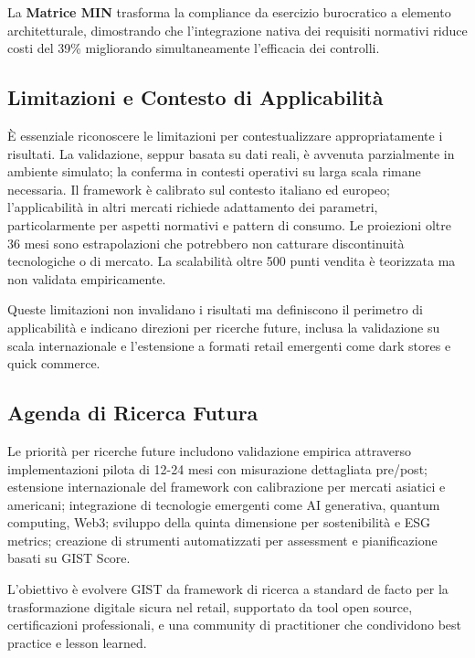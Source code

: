 La \textbf{Matrice MIN} trasforma la compliance da esercizio burocratico a elemento architetturale, dimostrando che l'integrazione nativa dei requisiti normativi riduce costi del 39\% migliorando simultaneamente l'efficacia dei controlli.

\subsection{\texorpdfstring{Limitazioni e Contesto di Applicabilità}{5.5.2 - Limitazioni e Contesto di Applicabilità}}
\label{subsec:5.5.2}

È essenziale riconoscere le limitazioni per contestualizzare appropriatamente i risultati. La validazione, seppur basata su dati reali, è avvenuta parzialmente in ambiente simulato; la conferma in contesti operativi su larga scala rimane necessaria. Il framework è calibrato sul contesto italiano ed europeo; l'applicabilità in altri mercati richiede adattamento dei parametri, particolarmente per aspetti normativi e pattern di consumo. Le proiezioni oltre 36 mesi sono estrapolazioni che potrebbero non catturare discontinuità tecnologiche o di mercato. La scalabilità oltre 500 punti vendita è teorizzata ma non validata empiricamente.

Queste limitazioni non invalidano i risultati ma definiscono il perimetro di applicabilità e indicano direzioni per ricerche future, inclusa la validazione su scala internazionale e l'estensione a formati retail emergenti come dark stores e quick commerce.

\subsection{\texorpdfstring{Agenda di Ricerca Futura}{5.5.3 - Agenda di Ricerca Futura}}
\label{subsec:5.5.3}

Le priorità per ricerche future includono validazione empirica attraverso implementazioni pilota di 12-24 mesi con misurazione dettagliata pre/post; estensione internazionale del framework con calibrazione per mercati asiatici e americani; integrazione di tecnologie emergenti come AI generativa, quantum computing, Web3; sviluppo della quinta dimensione per sostenibilità e ESG metrics; creazione di strumenti automatizzati per assessment e pianificazione basati su GIST Score.

L'obiettivo è evolvere GIST da framework di ricerca a standard de facto per la trasformazione digitale sicura nel retail, supportato da tool open source, certificazioni professionali, e una community di practitioner che condividono best practice e lesson learned.

